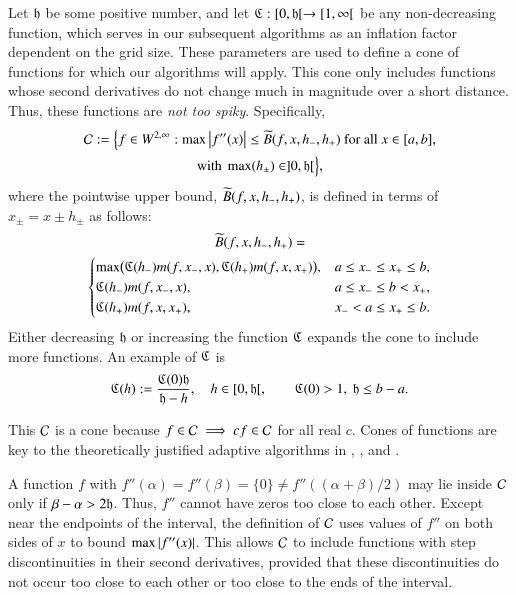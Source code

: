\documentclass[review]{elsarticle}
\makeatletter
\newcommand{\Vast}{\bBigg@{6}}
\theoremstyle{definition}
\newcommand{\Vastr}{\mathclose\Vast}
\renewcommand{\cw}{W}
\makeatother
\begin{document}
Let $\mathfrak{h}$ be some positive number, and let $\mathfrak{C} : [0,\mathfrak{h}[ \to [1,\infty[$ be any
non-decreasing function, which serves in our subsequent algorithms as an inflation factor dependent on the grid size.
These parameters are used to define a cone of functions for which our algorithms will
apply.  This cone only includes functions whose second derivatives do not change much in
magnitude over a short distance.  Thus, these functions are \emph{not too spiky}.  Specifically,
\begin{multline} \label{conedef}
 \cc :=   \Bigl \{
 f  \in    \cw^{2,\infty}:   \max\abs{f''(x)}  \le \tB(f,x,h_-,h_+)  \text{ for all } x \in [a,b],
\\ \text{with }  \max(h_{\pm}) \in ]0, \fh[  \Bigr \},
\end{multline}
where the pointwise upper bound, $\widetilde{B}(f,x,h_-,h_+)$, is defined in terms of $x_{\pm} =x \pm h_{\pm}$ as follows:
\begin{multline*}
\tB(f,x,h_-,h_+)=\\
\begin{cases}
  \max\bigl(\fC(h_{-}) m(f,x_-,x),\fC(h_{+}) m(f,x,x_+)\bigr), & a \le x_- \le x_+ \le b,\\
\fC(h_{-}) m(f,x_-,x), & a \le x_- \le b <  x_+,\\
\fC(h_{+}) m(f,x,x_+), & x_- < a \le x_+ \le b.
\end{cases} %
\end{multline*}
Either decreasing $\mathfrak{h}$ or increasing the function $\mathfrak{C}$ expands the cone to include more functions.  An example of $\mathfrak{C}$ is
\begin{equation} \label{sampleC}
\mathfrak{C}(h) : = \frac{\mathfrak{C}(0) \mathfrak{h}}{\mathfrak{h} - h}, \quad h \in [0,\mathfrak{h}[, \qquad \mathfrak{C}(0) > 1,\ \mathfrak{h} \le b - a.
\end{equation}

This $\mathcal{C}$ is a cone because $f \in \mathcal{C} \implies cf \in \mathcal{C}$ for all real
$c$. Cones of
functions are key to the theoretically justified adaptive algorithms in
\cite{HicEtal14b},  \cite{Din15a}, and \cite{Ton14a}.

A function $f$ with $f''(\alpha) = f''(\beta) = \{0\} \ne f''((\alpha+\beta)/2)$ may
lie inside $\mathcal{C}$ only if $\beta - \alpha > 2\mathfrak{h}$. Thus, $f''$ cannot have zeros too close to each other.  Except near the endpoints of
the interval, the definition of $\mathcal{C}$ uses values of $f''$ on both sides of $x$
to bound $\max \left \lvert f''(x) \right \rvert$. This allows $\mathcal{C}$ to include functions with step
discontinuities in their second derivatives, provided that these discontinuities
do not occur too close to each other or too close to the ends of the interval.
\end{document}
